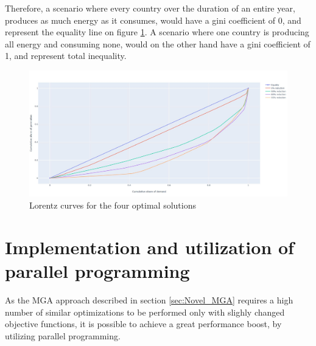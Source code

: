 Therefore, a scenario where every country over the duration of an entire year, produces as much energy as it consumes, would have a gini coefficient of 0, and represent the equality line on figure \ref{fig:Gini}. A scenario where one country is producing all energy and consuming none, would on the other hand have a gini coefficient of 1, and represent total inequality. 

\begin{figure}[h]\centering
	\includegraphics[width=1.\textwidth]{./Images/optimal_solutions_gini}
	\caption{Lorentz curves for the four optimal solutions }
	\label{fig:Gini}
\end{figure}


\section{Implementation and utilization of parallel programming}
As the MGA approach described in section \ref{sec:Novel_MGA} requires a high number of similar optimizations to be performed only with slighly changed objective functions, it is possible to achieve a great performance boost, by utilizing parallel programming. 








